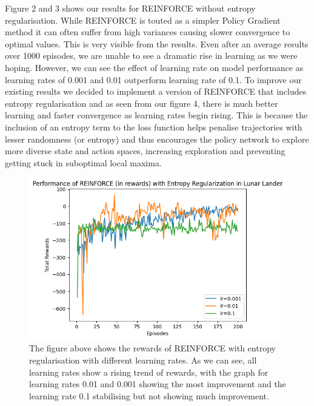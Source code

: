 \documentclass{article}
\begin{document}
Figure 2 and 3 shows our results for REINFORCE without entropy regularisation. While REINFORCE is touted as a simpler Policy Gradient method it can often suffer from high variances causing slower convergence to optimal values. This is very visible from the results. Even after an average results over 1000 episodes, we are unable to see a dramatic rise in learning as we were hoping. However, we can see the effect of learning rate on model performance as learning rates of 0.001 and 0.01 outperform learning rate of 0.1. To improve our existing results we decided to implement a version of REINFORCE that includes entropy regularisation and as seen from our figure 4, there is much better learning and faster convergence as learning rates begin rising. This is because the inclusion of an entropy term to the loss function helps penalise trajectories with lesser randomness (or entropy) and thus encourages the policy network to explore more diverse state and action spaces, increasing exploration and preventing getting stuck in suboptimal local maxima. 

\begin{figure}[htbp]
\centering
\includegraphics[width=0.9\linewidth]{Report/images/entropy_regularisation.png}
\caption{\label{fig:ReinforceEntropy_Rewards_LR}The figure above shows the rewards of REINFORCE with entropy regularisation with different learning rates. As we can see, all learning rates show a rising trend of rewards, with the graph for learning rates 0.01 and 0.001 showing the most improvement and the learning rate 0.1 stabilising but not showing much improvement. }
\end{figure}
\end{document}

